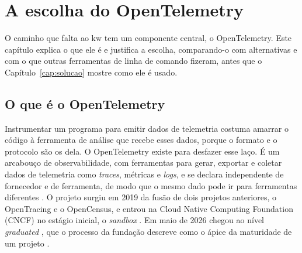
\chapter{A escolha do OpenTelemetry}

\label{cap:opentelemetry}

O caminho que falta ao kw tem um componente central, o OpenTelemetry. Este
capítulo explica o que ele é e justifica a escolha, comparando-o com
alternativas e com o que outras ferramentas de linha de comando fizeram, antes
que o Capítulo~\ref{cap:solucao} mostre como ele é usado.

\section{O que é o OpenTelemetry}
\label{sec:otel-o-que-e}

Instrumentar um programa para emitir dados de telemetria costuma amarrar o
código à ferramenta de análise que recebe esses dados, porque o formato e o
protocolo são os dela. O OpenTelemetry existe para desfazer esse laço. É um
arcabouço de observabilidade, com ferramentas para gerar, exportar e coletar
dados de telemetria como \textit{traces}, métricas e \textit{logs}, e se
declara independente de fornecedor e de ferramenta, de modo que o mesmo dado pode ir para
ferramentas diferentes \citep{otel_what_is}. O projeto surgiu em 2019 da fusão
de dois projetos anteriores, o OpenTracing e o OpenCensus, e entrou na Cloud
Native Computing Foundation (CNCF) no estágio inicial, o \textit{sandbox}
\citep{cncf_otel_history_2019}. Em maio de 2026 chegou ao nível
\textit{graduated} \citep{cncf_otel_project}, que o processo da fundação
descreve como o ápice da maturidade de um projeto
\citep{cncf_project_lifecycle}.

